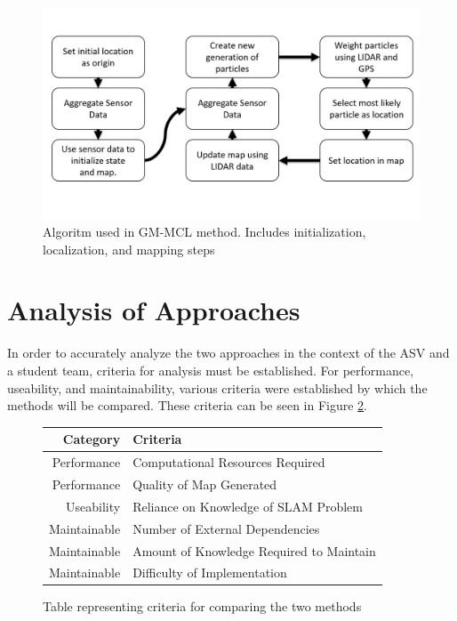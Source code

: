 \documentclass[10pt]{IEEEtran}
\begin{document}
\begin{figure}
\includegraphics[width=\columnwidth]{Figures/slamAlg}
\caption{Algoritm used in GM-MCL method.  Includes initialization, localization, and mapping steps}
\label{fig:SlamAlg}
\end{figure}

\section{Analysis of Approaches}
In order to accurately analyze the two approaches in the context of the ASV and a student
team, criteria for analysis must be established.  For performance, useability, and 
maintainability, various criteria were established by which the methods will be compared.
These criteria can be seen in Figure \ref{fig:AnalysisCriteria}.

\begin{figure}
\begin{tabular} { r | l }
	Category & Criteria \\
	\hline Performance & Computational Resources Required \\
	Performance & Quality of Map Generated \\
	Useability & Reliance on Knowledge of SLAM Problem \\
	Maintainable & Number of External Dependencies \\
	Maintainable & Amount of Knowledge Required to Maintain \\
	Maintainable & Difficulty of Implementation
\end{tabular}
\caption{Table representing criteria for comparing the two methods}
\label{fig:AnalysisCriteria}
\end{figure}
\end{document}

